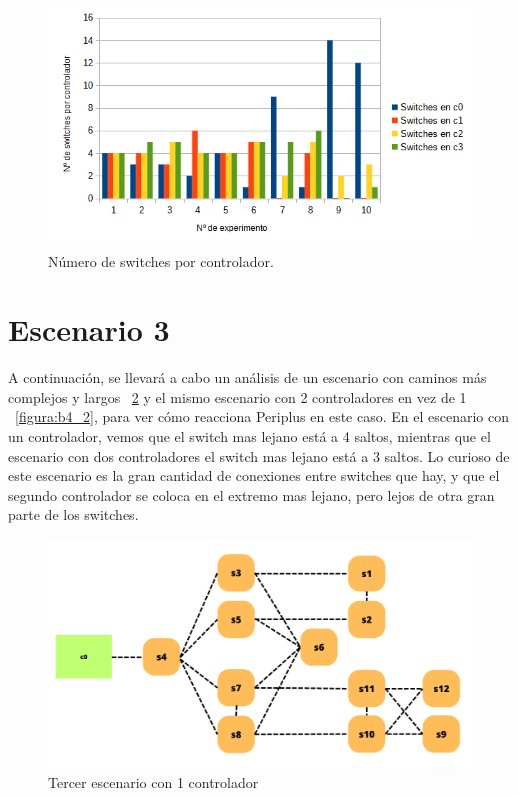 \documentclass[a4paper, 12pt]{book}
\begin{document}
 	
 	\begin{figure}[H]
 		\centering
 		\includegraphics[width=16cm, keepaspectratio]{img/switchesporcontrollermesh}
 		\caption{Número de switches por controlador.}
 		\label{figura:switchesporcontrollermesh}
 	\end{figure}
 	
 	
 	\clearpage
 	\section{Escenario 3}
 	 
 	A continuación, se llevará a cabo un análisis de un escenario con caminos más complejos y largos ~\ref{figura:b4_1} y el mismo escenario con 2 controladores en vez de 1 ~\ref{figura:b4_2}, para ver cómo reacciona Periplus en este caso.
 	En el escenario con un controlador, vemos que el switch mas lejano está a 4 saltos, mientras que el escenario con dos controladores el switch mas lejano está a 3 saltos. Lo curioso de este escenario es la gran cantidad de conexiones entre switches que hay, y que el segundo controlador se coloca en el extremo mas lejano, pero lejos de otra gran parte de los switches.
 	
 	\begin{figure}[H]
 		\centering
 		\includegraphics[width=14cm, keepaspectratio]{img/b4_1}
 		\caption{Tercer escenario con 1 controlador}
 		\label{figura:b4_1}
 	\end{figure}
 	
\end{document}
